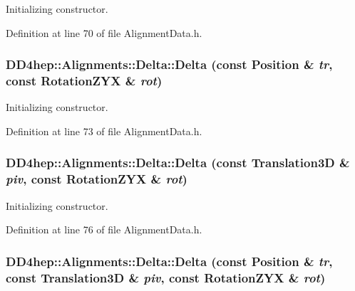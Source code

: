 Initializing constructor. 

Definition at line 70 of file AlignmentData.h.\hypertarget{class_d_d4hep_1_1_alignments_1_1_delta_a0e678885ecb41d17d6a4d3f2ded6679e}{
\subsubsection[{Delta}]{\setlength{\rightskip}{0pt plus 5cm}DD4hep::Alignments::Delta::Delta (const Position \& {\em tr}, \/  const RotationZYX \& {\em rot})}}
\label{class_d_d4hep_1_1_alignments_1_1_delta_a0e678885ecb41d17d6a4d3f2ded6679e}


Initializing constructor. 

Definition at line 73 of file AlignmentData.h.\hypertarget{class_d_d4hep_1_1_alignments_1_1_delta_a8ade447b698a6765cf76eb5e98af91ad}{
\subsubsection[{Delta}]{\setlength{\rightskip}{0pt plus 5cm}DD4hep::Alignments::Delta::Delta (const Translation3D \& {\em piv}, \/  const RotationZYX \& {\em rot})}}
\label{class_d_d4hep_1_1_alignments_1_1_delta_a8ade447b698a6765cf76eb5e98af91ad}


Initializing constructor. 

Definition at line 76 of file AlignmentData.h.\hypertarget{class_d_d4hep_1_1_alignments_1_1_delta_a1694ccda25ab2214ec8145c36153ab37}{
\subsubsection[{Delta}]{\setlength{\rightskip}{0pt plus 5cm}DD4hep::Alignments::Delta::Delta (const Position \& {\em tr}, \/  const Translation3D \& {\em piv}, \/  const RotationZYX \& {\em rot})}}
\label{class_d_d4hep_1_1_alignments_1_1_delta_a1694ccda25ab2214ec8145c36153ab37}


